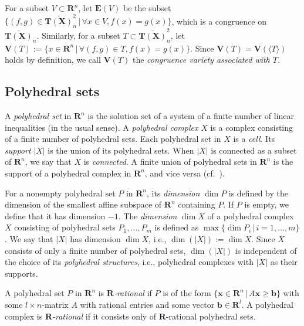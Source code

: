 \documentclass[a4paper,12pt]{amsart}
\begin{document}
For a subset $V \subset \boldsymbol{R}^n$, let $\boldsymbol{E}(V)$ be the subset $\{ (f, g) \in \overline{\boldsymbol{T}(\boldsymbol{X})}_n^2 \,|\, \forall x \in V, f(x) = g(x) \}$, which is a congruence on $\overline{\boldsymbol{T}(\boldsymbol{X})}_n$.
Similarly, for a subset $T \subset \overline{\boldsymbol{T}(\boldsymbol{X})}_n^2$, let $\boldsymbol{V}(T) := \{ x \in \boldsymbol{R}^n \,|\, \forall (f, g) \in T, f(x) = g(x) \}$.
Since $\boldsymbol{V}(T) = \boldsymbol{V}(\langle T \rangle)$ holds by definition, we call $\boldsymbol{V}(T)$ the \textit{congruence variety associated with $T$}.

\subsection{Polyhedral sets}
	\label{subsection2.3}

A \textit{polyhedral set} in $\boldsymbol{R}^n$ is the solution set of a system of a finite number of linear inequalities (in the usual sense).
A \textit{polyhedral complex} $X$ is a complex consisting of a finite number of polyhedral sets.
Each polyhedral set in $X$ is a \textit{cell}.
Its \textit{support} $|X|$ is the union of its polyhedral sets.
When $|X|$ is connected as a subset of $\boldsymbol{R}^n$, we say that $X$ is \textit{connected}.
A finite union of polyhedral sets in $\boldsymbol{R}^n$ is the support of a polyhedral complex in $\boldsymbol{R}^n$, and vice versa (cf.~\cite[Proposition~4.1.1(a)]{Mikhalkin=Rau}).

For a nonempty polyhedral set $P$ in $\boldsymbol{R}^n$, its \textit{dimension} $\operatorname{dim}P$ is defined by the dimension of the smallest affine subspace of $\boldsymbol{R}^n$ containing $P$.
If $P$ is empty, we define that it has dimension $-1$.
The \textit{dimension} $\operatorname{dim}X$ of a polyhedral complex $X$ consisting of polyhedral sets $P_1, \ldots, P_m$ is defined as $\operatorname{max}\{ \operatorname{dim}P_i \,|\, i = 1, \ldots, m\}$.
We say that $|X|$ has dimension $\operatorname{dim}X$, i.e., $\operatorname{dim}(|X|) := \operatorname{dim}X$.
Since $X$ consists of only a finite number of polyhedral sets, $\operatorname{dim}(|X|)$ is independent of the choice of its \textit{polyhedral structures}, i.e., polyhedral complexes with $|X|$ as their supports.

A polyhedral set $P$ in $\boldsymbol{R}^n$ is \textit{$\boldsymbol{R}$-rational} if $P$ is of the form $\{ \boldsymbol{x} \in \boldsymbol{R}^n \,|\, A\boldsymbol{x} \ge \boldsymbol{b} \}$ with some $l \times n$-matrix $A$ with rational entries and some vector $\boldsymbol{b} \in \boldsymbol{R}^l$.
A polyhedral complex is \textit{$\boldsymbol{R}$-rational} if it consists only of $\boldsymbol{R}$-rational polyhedral sets.
\end{document}

